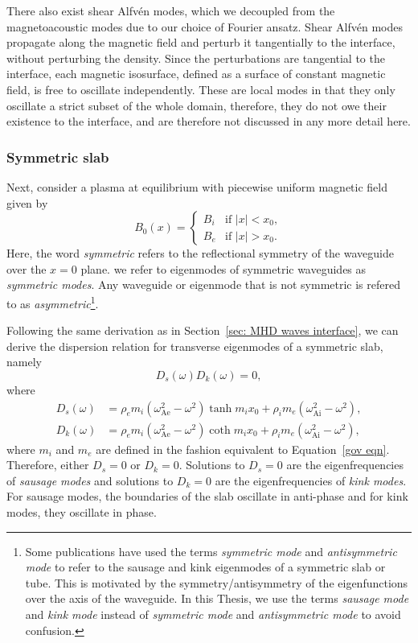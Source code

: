 \documentclass[12pt]{../style-files/ociamthesis}
\begin{document}
There also exist shear Alfv\'{e}n modes, which we decoupled from the magnetoacoustic modes due to our choice of Fourier ansatz. Shear Alfv\'{e}n modes propagate along the magnetic field and perturb it tangentially to the interface, without perturbing the density. Since the perturbations are tangential to the interface, each magnetic isosurface, defined as a surface of constant magnetic field, is free to oscillate independently. These are local modes in that they only oscillate a strict subset of the whole domain, therefore, they do not owe their existence to the interface, and are therefore not discussed in any more detail here.


\subsubsection{Symmetric slab} \label{sec: MHD waves sym slab}

Next, consider a plasma at equilibrium  with piecewise uniform magnetic field given by
\begin{equation}
B_0(x) =
\begin{cases}
B_i & \text{if } |x| < x_0, \\
B_e & \text{if } |x| > x_0.
\end{cases}
\end{equation}
Here, the word \textit{symmetric} refers to the reflectional symmetry of the waveguide over the $x = 0$ plane. we refer to eigenmodes of symmetric waveguides as \textit{symmetric modes}. Any waveguide or eigenmode that is not symmetric is refered to as \textit{asymmetric}\footnote{Some publications have used the terms \textit{symmetric mode} and \textit{antisymmetric mode} to refer to the sausage and kink eigenmodes of a symmetric slab or tube. This is motivated by the symmetry/antisymmetry of the eigenfunctions over the axis of the waveguide. In this Thesis, we use the terms \textit{sausage mode} and \textit{kink mode} instead of \textit{symmetric mode} and \textit{antisymmetric mode} to avoid confusion.}.

Following the same derivation as in Section~\ref{sec: MHD waves interface}, we can derive the dispersion relation for transverse eigenmodes of a symmetric slab, namely
\begin{equation}
	D_s(\omega)D_k(\omega) = 0, \label{DR sym slab}
\end{equation}
where
\begin{align}
	D_s(\omega) &= \rho_em_i(\omega_\textrm{Ae}^2 - \omega^2)\tanh{m_ix_0} + \rho_im_e(\omega_\textrm{Ai}^2 - \omega^2), \\
	D_k(\omega) &= \rho_em_i(\omega_\textrm{Ae}^2 - \omega^2)\coth{m_ix_0} + \rho_im_e(\omega_\textrm{Ai}^2 - \omega^2),
\end{align}
where $m_i$ and $m_e$ are defined in the fashion equivalent to Equation~\eqref{gov eqn}. Therefore, either $D_s = 0$ or $D_k = 0$. Solutions to $D_s = 0$ are the eigenfrequencies of \textit{sausage modes} and solutions to $D_k = 0$ are the eigenfrequencies of \textit{kink modes}. For sausage modes, the boundaries of the slab oscillate in anti-phase and for kink modes, they oscillate in phase.
\end{document}
